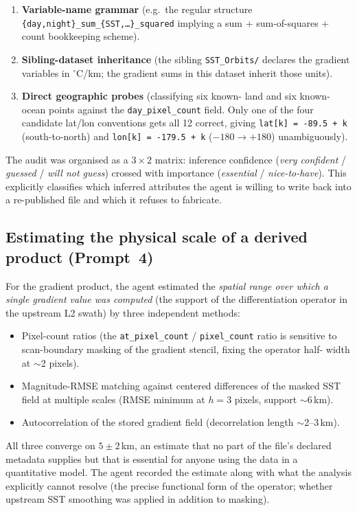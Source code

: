 \documentclass[11pt]{article}
\begin{document}
\begin{enumerate}[topsep=2pt]
  \item \textbf{Variable-name grammar} (e.g.\ the regular structure
    \texttt{\{day,night\}\_sum\_\{SST,\dots\}\_squared} implying
    a sum + sum-of-squares + count bookkeeping scheme).
  \item \textbf{Sibling-dataset inheritance} (the sibling
    \texttt{SST\_Orbits/} declares the gradient variables in
    $^\circ$C/km; the gradient sums in this dataset inherit
    those units).
  \item \textbf{Direct geographic probes} (classifying six known-
    land and six known-ocean points against the
    \texttt{day\_pixel\_count} field. Only one of the four
    candidate lat/lon conventions gets all 12 correct, giving
    \texttt{lat[k] = -89.5 + k} (south-to-north) and
    \texttt{lon[k] = -179.5 + k} ($-180\to+180$) unambiguously).
\end{enumerate}

The audit was organised as a $3 \times 2$ matrix:
inference confidence (\emph{very confident} / \emph{guessed} /
\emph{will not guess}) crossed with importance (\emph{essential} /
\emph{nice-to-have}). This explicitly classifies which inferred
attributes the agent is willing to write back into a re-published
file and which it refuses to fabricate.

\subsection{Estimating the physical scale of a derived product (Prompt~4)}

For the gradient product, the agent estimated the \emph{spatial
range over which a single gradient value was computed} (the
support of the differentiation operator in the upstream L2 swath)
by three independent methods:
\begin{itemize}[topsep=2pt]
  \item Pixel-count ratios (the \texttt{at\_pixel\_count} /
    \texttt{pixel\_count} ratio is sensitive to scan-boundary
    masking of the gradient stencil, fixing the operator half-
    width at $\sim$2 pixels).
  \item Magnitude-RMSE matching against centered differences of
    the masked SST field at multiple scales (RMSE minimum at $h=3$
    pixels, support $\sim$6\,km).
  \item Autocorrelation of the stored gradient field
    (decorrelation length $\sim$2--3\,km).
\end{itemize}
All three converge on $5 \pm 2$\,km, an estimate that no part of
the file's declared metadata supplies but that is essential for
anyone using the data in a quantitative model. The agent recorded
the estimate along with what the analysis explicitly cannot
resolve (the precise functional form of the operator; whether
upstream SST smoothing was applied in addition to masking).
\end{document}

